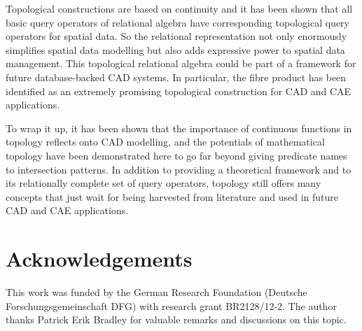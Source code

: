 \documentclass[5p]{elsarticle}
\begin{document}
Topological constructions are based on continuity and it has been shown that all basic query 
operators of relational algebra have corresponding topological query operators for spatial data. 
So the relational representation not only enormously simplifies spatial data modelling but 
also adds expressive power to spatial data management. 
This topological relational algebra could be part of a framework for future database-backed CAD 
systems. In particular, the fibre product has been identified as an extremely promising 
topological construction for CAD and CAE applications. 

To wrap it up, it has been shown that the importance of continuous functions in topology 
reflects onto CAD modelling, and the potentials of mathematical topology have been demonstrated 
here to go far beyond giving predicate names to intersection patterns. 
In addition to providing a theoretical framework and to its relationally complete set of 
query operators, topology still offers many concepts that just wait for being harvested 
from literature and used in future CAD and CAE applications. 


\section{Acknowledgements}

This work was funded by the German Research Foundation (Deutsche Forschungsgemeinschaft DFG) with 
research grant BR2128/12-2. The author thanks Patrick Erik Bradley for valuable remarks and 
discussions on this topic. 



\end{document}
